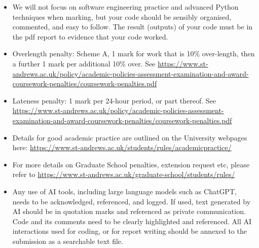 \documentclass[a4paper,11pt]{article}
\begin{document}
\begin{itemize}
\item We will not focus on software engineering practice and advanced Python 
techniques when marking, but your code should be sensibly organised, commented, and easy to follow. The result (outputs) of your code must be in the pdf report to evidence that your code worked.
\item Overlength penalty: Scheme A, 1 mark for work that is 10\% over-length, then a further 1 mark per additional 10\% over. See \url{https://www.st-andrews.ac.uk/policy/academic-policies-assessment-examination-and-award-coursework-penalties/coursework-penalties.pdf} 
\item
Lateness penalty: 1 mark per 24-hour period, or part thereof. See \url{https://www.st-andrews.ac.uk/policy/academic-policies-assessment-examination-and-award-coursework-penalties/coursework-penalties.pdf} 
\item
Details for good academic practice are outlined on the University webpages here:
\url{https://www.st-andrews.ac.uk/students/rules/academicpractice/}
\item For more details on Graduate School penalties, extension request etc, please refer to \url{https://www.st-andrews.ac.uk/graduate-school/students/rules/}
\item Any use of AI tools, including large language models such as ChatGPT, needs to be acknowledged, referenced, and logged.
If used, text generated by AI should be in quotation marks and referenced as private communication. Code and its comments need to be clearly highlighted and referenced. All
AI interactions used for coding, or for report writing should be annexed to the submission as a searchable text file.


\end{itemize}
\end{document}
